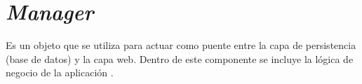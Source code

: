 \section{\textit{Manager}}

Es un objeto que se utiliza para actuar como puente entre la capa de persistencia (base de datos) y la capa web. Dentro de este componente se incluye la lógica de negocio de la aplicación \cite{MNG0}. 